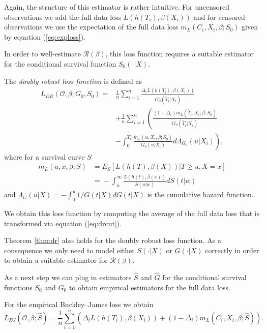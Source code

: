 \documentclass[12pt, a4paper]{scrartcl}
\theoremstyle{definition}
\theoremstyle{plain}
\numberwithin{equation}{section}
\numberwithin{figure}{section}
\numberwithin{table}{section}
\begin{document}
	Again, the structure of this estimator is rather intuitive.
	For uncensored observations we add the full data loss $L(h(T_i), \beta(X_i))$ and for censored observations we use the expectation of the full data loss $m_L(C_i, X_i, \beta; S_0)$ given by equation (\ref{eq:exploss}).
	
	In order to well-estimate $\mathcal{R}(\beta)$, this loss function requires a suitable estimator for the conditional survival function $S_0(\cdot\vert X)$.
	
	The \emph{doubly robust loss function} is defined as
	\begin{equation}\label{eq:dr}
	\begin{split}
		L_{DR}(\mathcal{O}, \beta; G_0, S_0) ={} & \frac{1}{n} \sum_{i=1}^n \frac{\Delta_i L(h(T_i),\beta(X_i))}{G_0(\tilde{T}_i\vert X_i)}\\
		~ & + \frac{1}{n} \sum_{i=1}^n \left(\frac{(1-\Delta_i)m_L(\tilde{T_i}, X_i, \beta; S_0)}{G_0(\tilde{T_i}\vert X_i)} \right.\\
		& - \left. \int _0^{\tilde{T_i}} \frac{m_L(u, X_i, \beta; S_0)}{G_0(u \vert X_i)} d \Lambda_{G_0}(u \vert X_i) \right),
	\end{split}
	\end{equation}
	where for a survival curve $S$
	\begin{equation}\label{eq:exploss}
	\begin{split}
		m_L(u,x,\beta; S) &={} E_S[L(h(T), \beta(X)) \vert T \geq u, X = x]\\
		&={} - \int_u^{\infty} \frac{L(h(t), \beta(x))}{S(u \vert w)} dS(t\vert w)
	\end{split}
	\end{equation}
	and $\Lambda_G(u\vert X) = - \int_0^u  1/ G(t\vert X)dG(t \vert X)$ is the cumulative hazard function.
	
	We obtain this loss function by computing the average of the full data loss that is transformed via equation (\ref{eq:drcut}).
	
	Theorem \ref{thm:dr} also holds for the doubly robust loss function.
	As a consequence we only need to model either $S(\cdot\vert X)$ or $G(\cdot\vert X)$ correctly in order to obtain a suitable estimator for $\mathcal{R}(\beta)$.
	
	As a next step we can plug in estimators $\hat{S}$ and $\hat{G}$ for the conditional survival functions $S_0$ and $G_0$ to obtain empirical estimators for the full data loss.
	
	For the empirical Buckley--James loss we obtain
	\begin{equation*}
	L_{BJ}(\mathcal{O}, \beta; \hat{S}) = \frac{1}{n} \sum_{i=1}^n \left( \Delta_i L(h(T_i), \beta(X_i))+(1-\Delta_i)m_L(C_i, X_i, \beta; \hat{S})\right).
	\end{equation*}
	
\end{document}
